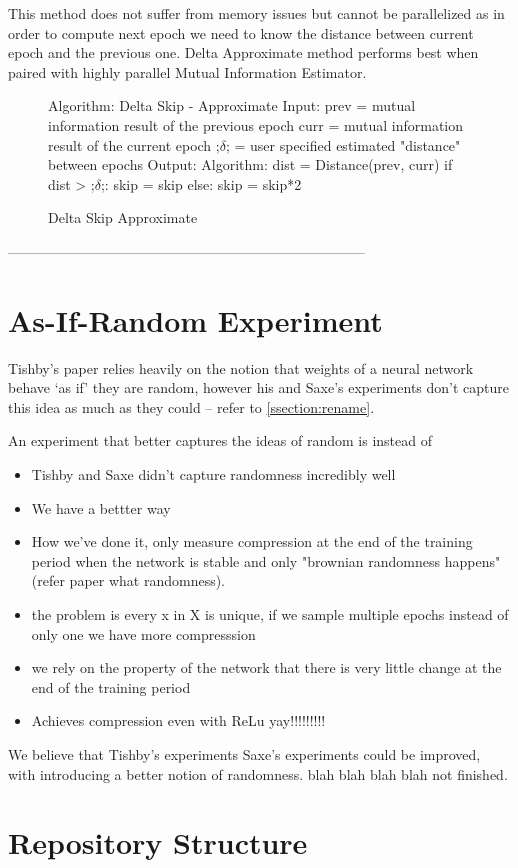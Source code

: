   This method does not suffer from memory issues but cannot be parallelized as
  in order to compute next epoch we need to know the distance between current
  epoch and the previous one. Delta Approximate method performs best when paired
  with highly parallel Mutual Information Estimator.

\begin{figure}[H]
    \begin{pythonfigure}
      Algorithm: Delta Skip - Approximate
      Input:
      prev = mutual information result of the previous epoch
      curr = mutual information result of the current epoch
      ;$\delta$; = user specified estimated "distance" between epochs
      Output:
      Algorithm:
      dist = Distance(prev, curr)
      if dist > ;$\delta$;:
        skip = skip
      else:
        skip = skip*2
    \end{pythonfigure}
    \caption{Delta Skip Approximate}
    \label{fig:deltaapprox}
\end{figure}

-----------------------------------------------------------------------------

\section{As-If-Random Experiment}

Tishby's paper relies heavily on the notion that weights of a neural network
behave `as if' they are random, however his and Saxe's experiments don't capture
this idea as much as they could -- refer to \autoref{ssection:rename}. 

An experiment that better captures the ideas of random is instead of 


\begin{itemize}
  \item{
      Tishby and Saxe didn't capture randomness incredibly well 
    }
  \item{
      We have a bettter way
    }
  \item{
      How we've done it, only measure compression at the end of the training
      period when the network is stable and only "brownian randomness
      happens"(refer paper what randomness).
    }
  \item{
      the problem is every x in X is unique, if we sample multiple epochs
      instead of only one we have more compresssion
    }
  \item{
      we rely on the property of the network that there is very little change at
      the end of the training period
    }
  \item{
      Achieves compression even with ReLu yay!!!!!!!!!
    }
\end{itemize}


We believe that Tishby's experiments Saxe's experiments could be improved, with
introducing a better notion of randomness. blah blah blah blah not finished.


\section{Repository Structure}
